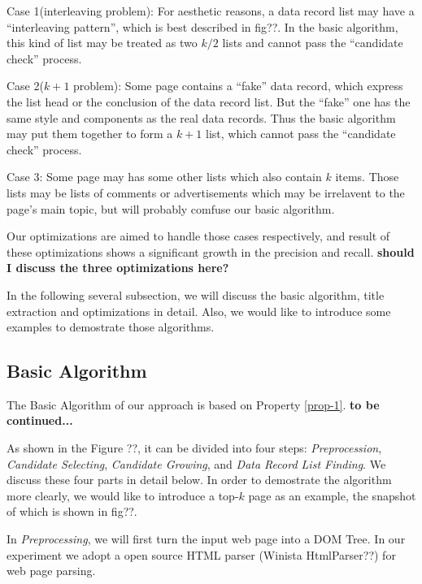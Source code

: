 Case 1(interleaving problem):  
For aesthetic reasons, a data record list may have a ``interleaving pattern'', which is best described in fig??.
In the basic algorithm, this kind of list may be treated as two $k/2$ lists and cannot pass the ``candidate check'' process.

Case 2($k+1$ problem):
Some page contains a ``fake'' data record, which express the list head or the conclusion of the data record list.
But the ``fake'' one has the same style and components as the real data records.
Thus the basic algorithm may put them together to form a $k+1$ list, 
which cannot pass the ``candidate check'' process.

Case 3:
Some page may has some other lists which also contain $k$ items.
Those lists may be lists of comments or advertisements 
which may be irrelavent to the page's main topic, 
but will probably comfuse our basic algorithm.

Our optimizations are aimed to handle those cases respectively, 
and result of these optimizations shows a significant growth in the precision and recall.
{\bf should I discuss the three optimizations here?}



In the following several subsection, we will discuss the basic algorithm, title extraction and optimizations in detail.
Also, we would like to introduce some examples to demostrate those algorithms.

\subsection{Basic Algorithm}

The Basic Algorithm of our approach is based on Property \ref{prop-1}.
{\bf to be continued...}

As shown in the Figure ??, it can be divided into 
four steps: 
{\em Preprocession}, 
{\em Candidate Selecting}, 
{\em Candidate Growing}, 
and {\em Data Record List Finding}. 
We discuss these four parts in detail below. 
In order to demostrate the algorithm more clearly, 
we would like to introduce a top-$k$ page as an example,
the snapshot of which is shown in fig??.


In {\em Preprocessing}, 
we will first turn the input web page into a DOM Tree.
In our experiment we adopt a open source HTML parser (Winista HtmlParser??) for web page parsing.

